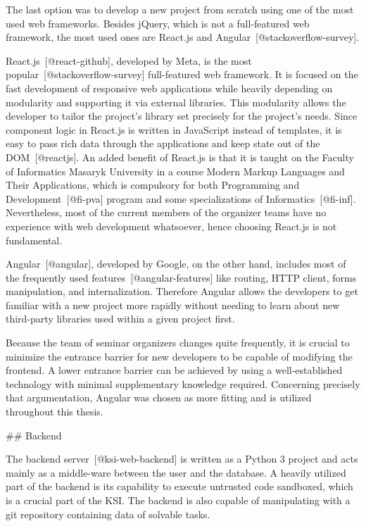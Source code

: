 \documentclass[
  digital, %
  oneside, %
  lof,     %
  lot,     %
]{fithesis4}
\begin{document}
The last option was to develop a new project from scratch using one of the most used web frameworks. Besides jQuery, which is not a full-featured web framework, the most used ones are React.js and Angular~[@stackoverflow-survey].

React.js~[@react-github], developed by Meta, is the most popular~[@stackoverflow-survey] full-featured web framework. It is focused on the fast development of responsive web applications while heavily depending on modularity and supporting it via external libraries. This modularity allows the developer to tailor the project's library set precisely for the project's needs. Since component logic in React.js is written in JavaScript instead of templates, it is easy to pass rich data through the applications and keep state out of the DOM~[@reactjs]. An added benefit of React.js is that it is taught on the Faculty of Informatics Masaryk University in a course Modern Markup Languages and Their Applications, which is compulsory for both
Programming and Development~[@fi-pva] program and some specializations of Informatics~[@fi-inf]. Nevertheless, most of the current members of the organizer teams have no experience with web development whatsoever, hence choosing React.js is not fundamental.

Angular~[@angular], developed by Google, on the other hand, includes most of the frequently used features~[@angular-features] like routing, HTTP client, forms manipulation, and internalization. Therefore Angular allows the developers to get familiar with a new project more rapidly without needing to learn about new third-party libraries used within a given project first.

Because the team of seminar organizers changes quite frequently, it is crucial to minimize the entrance barrier for new developers to be capable of modifying the frontend. A lower entrance barrier can be achieved by using a well-established technology with minimal supplementary knowledge required. Concerning precisely that argumentation, Angular was chosen as more fitting and is utilized throughout this thesis.

## Backend

The backend server~[@ksi-web-backend] is written as a Python 3 project and acts mainly as a middle-ware between the user and the database. A heavily utilized part of the backend is its capability to execute untrusted code sandboxed, which is a crucial part of the KSI. The backend is also capable of manipulating with a git repository containing data of solvable tasks.
\end{document}
